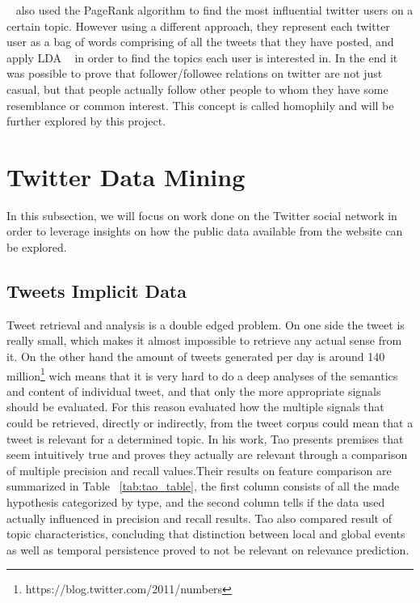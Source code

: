 ~\citet{Weng2010} also used the PageRank algorithm to find the most influential twitter users on a certain topic. However using a different approach, they represent each twitter user as a bag of words comprising of all the tweets that they have posted, and apply \ac{LDA} ~\cite{Blei2003} in order to find the topics each user is interested in. In the end it was possible to prove that follower/followee relations on twitter are not just casual, but that people actually follow other people to whom they have some resemblance or common interest. This concept is called homophily and will be further explored by this project.

\section{Twitter Data Mining} 
\label{sec:data_mining_in_twitter_}
In this subsection, we will focus on work done on the Twitter social network in order to leverage insights on how the public data available from the website can be explored. 

\subsection{Tweets Implicit Data} 
\label{sub:the_tweet}
Tweet retrieval and analysis is a double edged problem. On one side the tweet is really small, which makes it almost impossible to retrieve any actual sense from it. On the other hand the amount of tweets generated per day is around 140 million\footnote{https://blog.twitter.com/2011/numbers} wich means that it is very hard to do a deep analyses of the semantics and content of individual tweet, and that only the more appropriate signals should be evaluated.
For this reason \citet{Tao2012} evaluated how the multiple signals that could be retrieved, directly or indirectly, from the tweet corpus could mean that a tweet is relevant for a determined topic. In his work, Tao presents premises that seem intuitively true and proves they actually are relevant through a comparison of multiple precision and recall values.Their results on feature comparison are summarized in Table ~\ref{tab:tao_table}, the first column consists of all the made hypothesis categorized by type, and the second column tells if the data used actually influenced in precision and recall results. Tao also compared result of topic characteristics, concluding that distinction between local and global events as well as temporal persistence proved to not be relevant on relevance prediction.

